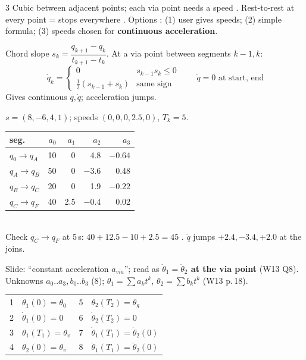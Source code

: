 \begin{multicols}{3}
Cubic between adjacent points; each via point needs a speed . Rest-to-rest at every point = stops everywhere . Options : (1) user gives speeds; (2) simple formula; (3) speeds chosen for \textbf{continuous acceleration}.
\begin{fbx}
Chord slope $s_k=\dfrac{q_{k+1}-q_k}{t_{k+1}-t_k}$. At a via point between segments $k{-}1,k$:
\[\dot q_k=\begin{cases}0 & s_{k-1}s_k\le0\\ \tfrac12(s_{k-1}+s_k) & \text{same sign}\end{cases}\qquad \dot q=0\text{ at start, end}\]
Gives continuous $q,\dot q$; acceleration jumps.
\end{fbx}
\begin{worked}[notebook Q2: $q=10,50,20,40,45^\circ$ at $t=0,5,10,15,20$\,s]
$s=(8,-6,4,1)$; speeds $(0,0,0,2.5,0)$, $T_k=5$.
\begin{tabular}{@{}lrrrr@{}}\toprule seg.&$a_0$&$a_1$&$a_2$&$a_3$\\\midrule
$q_0\to q_A$&10&0&4.8&$-0.64$\\$q_A\to q_B$&50&0&$-3.6$&0.48\\$q_B\to q_C$&20&0&1.9&$-0.22$\\$q_C\to q_F$&40&2.5&$-0.4$&0.02\\\bottomrule\end{tabular}\\
Check $q_C\to q_F$ at 5\,s: $40+12.5-10+2.5=45$ \checkmark. $\ddot q$ jumps $+2.4,-3.4,+2.0$ at the joins. \chk
\end{worked}
Slide: ``constant acceleration $a_{via}$''; read as \textbf{$\ddot\theta_1=\ddot\theta_2$ at the via point} (W13 Q8). Unknowns $a_0..a_3,b_0..b_3$ (8); $\theta_1=\sum a_kt^k$, $\theta_2=\sum b_kt^k$ (W13 p.\,18).
\begin{fbx}[8 conditions]
\begin{tabularx}{\linewidth}{@{}rXrX@{}}
1&$\theta_1(0)=\theta_0$&5&$\theta_2(T_2)=\theta_g$\\
2&$\dot\theta_1(0)=0$&6&$\dot\theta_2(T_2)=0$\\
3&$\theta_1(T_1)=\theta_v$&7&$\dot\theta_1(T_1)=\dot\theta_2(0)$\\
4&$\theta_2(0)=\theta_v$&8&$\ddot\theta_1(T_1)=\ddot\theta_2(0)$\\

\end{tabularx}
\end{fbx}
\end{multicols}
